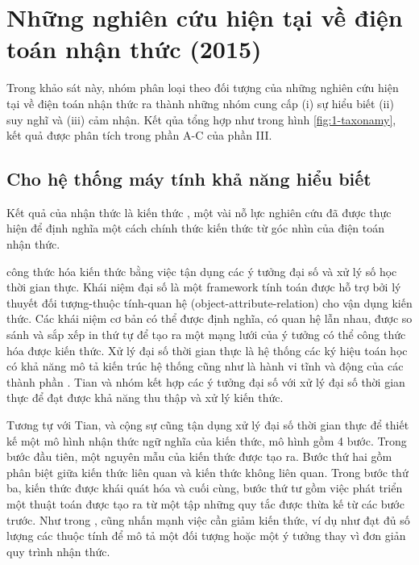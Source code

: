 \documentclass{article}
\begin{document}
\section{Những nghiên cứu hiện tại về điện toán nhận thức (2015)}\label{sec:3-current-researchs}

Trong khảo sát này, nhóm phân loại theo đối tượng của những nghiên cứu hiện tại về điện toán nhận thức ra thành những nhóm cung cấp (i) sự hiểu biết (ii) suy nghĩ và (iii) cảm nhận. Kết qủa tổng hợp như trong hình \ref{fig:1-taxonamy}, kết quả được phân tích trong phần A-C của phần III.


\subsection{Cho hệ thống máy tính khả năng hiểu biết}
Kết quả của nhận thức là kiến thức \citet{von1998cognition}, một vài nỗ lực nghiên cứu đã được thực hiện để định nghĩa một cách chính thức kiến thức từ góc nhìn của điện toán nhận thức.

 công thức hóa kiến thức bằng việc tận dụng các ý tưởng đại số và xử lý số học thời gian thực. Khái niệm đại số là một framework tính toán được hỗ trợ bởi lý thuyết đối tượng-thuộc tính-quan hệ (object-attribute-relation) cho vận dụng kiến thức. Các khái niệm cơ bản có thể được định nghĩa, có quan hệ lẫn nhau, được so sánh và sắp xếp in thứ tự để tạo ra một mạng lưới của ý tưởng có thể công thức hóa được kiến thức. Xử lý đại số thời gian thực là hệ thống các ký hiệu toán học có khả năng mô tả kiến trúc hệ thống cũng như là hành vi tĩnh và động của các thành phần \citep{wang2002real}. Tian và nhóm kết hợp các ý tưởng đại số với xử lý đại số thời gian thực để đạt được khả năng thu thập và xử lý kiến thức.

Tương tự với Tian,  và cộng sự cũng tận dụng xử lý đại số thời gian thực để thiết kế một mô hình nhận thức ngữ nghĩa của kiến thức, mô hình gồm 4 bước. Trong bước đầu tiên, một nguyên mẫu của kiến thức được tạo ra. Bước thứ hai gồm phân biệt giữa kiến thức liên quan và kiến thức không liên quan. Trong bước thứ ba, kiến thức được khái quát hóa và cuối cùng, bước thứ tư gồm việc phát triển một thuật toán được tạo ra từ một tập những quy tắc được thừa kế từ các bước trước. Như trong ,  cũng nhấn mạnh việc cần giảm kiến thức, ví dụ như đạt đủ số lượng các thuộc tính để mô tả một đối tượng hoặc một ý tưởng thay vì đơn giản quy trình nhận thức.
\end{document}

